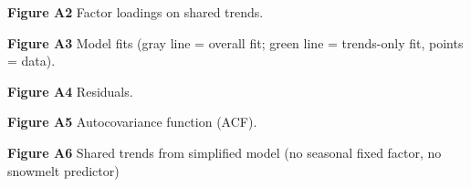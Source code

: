\documentclass[notitlepage]{article}
\begin{document}
\begin{center}
\end{center}
\textbf{Figure A2} Factor loadings on shared trends.

\begin{center}

\end{center}
\textbf{Figure A3} Model fits (gray line = overall fit; green line = trends-only fit, points = data).

\begin{center}

\end{center}
\textbf{Figure A4} Residuals.

\begin{center}

\end{center}
\textbf{Figure A5} Autocovariance function (ACF).

\begin{center}
\end{center}
\textbf{Figure A6} Shared trends from simplified model (no seasonal fixed factor, no snowmelt predictor)
\end{document}
